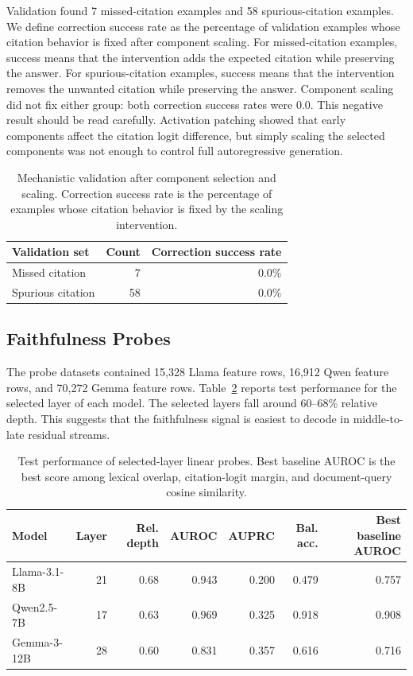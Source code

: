 \documentclass[11pt]{article}
\begin{document}
Validation found 7 missed-citation examples and 58 spurious-citation examples. We define correction success rate as the percentage of validation examples whose citation behavior is fixed after component scaling. For missed-citation examples, success means that the intervention adds the expected citation while preserving the answer. For spurious-citation examples, success means that the intervention removes the unwanted citation while preserving the answer. Component scaling did not fix either group: both correction success rates were 0.0. This negative result should be read carefully. Activation patching showed that early components affect the citation logit difference, but simply scaling the selected components was not enough to control full autoregressive generation.

\begin{table}[t]
\centering
\small
\begin{tabular}{lrr}
\toprule
Validation set & Count & Correction success rate \\
\midrule
Missed citation & 7 & 0.0\% \\
Spurious citation & 58 & 0.0\% \\
\bottomrule
\end{tabular}
\caption{Mechanistic validation after component selection and scaling. Correction success rate is the percentage of examples whose citation behavior is fixed by the scaling intervention.}
\label{tab:mechanistic-validation}
\end{table}

\subsection{Faithfulness Probes}

The probe datasets contained 15,328 Llama feature rows, 16,912 Qwen feature rows, and 70,272 Gemma feature rows. Table~\ref{tab:probes} reports test performance for the selected layer of each model. The selected layers fall around 60--68\% relative depth. This suggests that the faithfulness signal is easiest to decode in middle-to-late residual streams.

\begin{table}[t]
\centering
\small
\begin{tabular}{lrrrrrr}
\toprule
Model & Layer & Rel. depth & AUROC & AUPRC & Bal. acc. & Best baseline AUROC \\
\midrule
Llama-3.1-8B & 21 & 0.68 & 0.943 & 0.200 & 0.479 & 0.757 \\
\midrule
Qwen2.5-7B & 17 & 0.63 & 0.969 & 0.325 & 0.918 & 0.908 \\
\midrule
Gemma-3-12B & 28 & 0.60 & 0.831 & 0.357 & 0.616 & 0.716 \\
\bottomrule
\end{tabular}
\caption{Test performance of selected-layer linear probes. Best baseline AUROC is the best score among lexical overlap, citation-logit margin, and document-query cosine similarity.}
\label{tab:probes}
\end{table}
\end{document}

